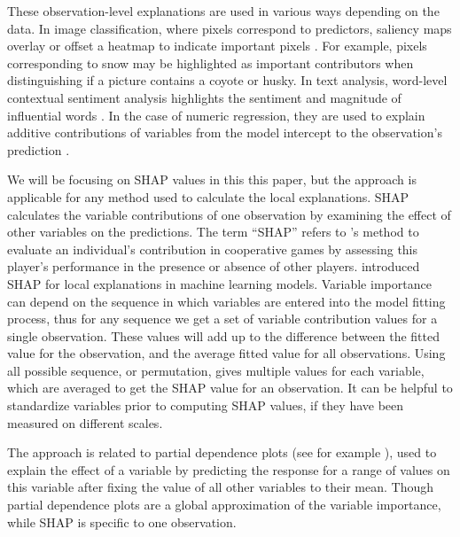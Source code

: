 \documentclass[
]{jss}
\begin{document}
These observation-level explanations are used in various ways depending on the data. In image classification, where pixels correspond to predictors, saliency maps overlay or offset a heatmap to indicate important pixels \citep{simonyan_deep_2014}. For example, pixels corresponding to snow may be highlighted as important contributors when distinguishing if a picture contains a coyote or husky. In text analysis, word-level contextual sentiment analysis highlights the sentiment and magnitude of influential words \citep{vanni_textual_2018}. In the case of numeric regression, they are used to explain additive contributions of variables from the model intercept to the observation's prediction \citep{ribeiro_why_2016}.

We will be focusing on SHAP values in this this paper, but the approach is applicable for any method used to calculate the local explanations. SHAP calculates the variable contributions of one observation by examining the effect of other variables on the predictions. The term ``SHAP'' refers to \citet{shapley_value_1953}'s method to evaluate an individual's contribution in cooperative games by assessing this player's performance in the presence or absence of other players. \citet{strumbelj_efficient_2010} introduced SHAP for local explanations in machine learning models. Variable importance can depend on the sequence in which variables are entered into the model fitting process, thus for any sequence we get a set of variable contribution values for a single observation. These values will add up to the difference between the fitted value for the observation, and the average fitted value for all observations. Using all possible sequence, or permutation, gives multiple values for each variable, which are averaged to get the SHAP value for an observation. It can be helpful to standardize variables prior to computing SHAP values, if they have been measured on different scales.

The approach is related to partial dependence plots (see for example \citet{molnar_interpretable_2020}), used to explain the effect of a variable by predicting the response for a range of values on this variable after fixing the value of all other variables to their mean. Though partial dependence plots are a global approximation of the variable importance, while SHAP is specific to one observation.
\end{document}
